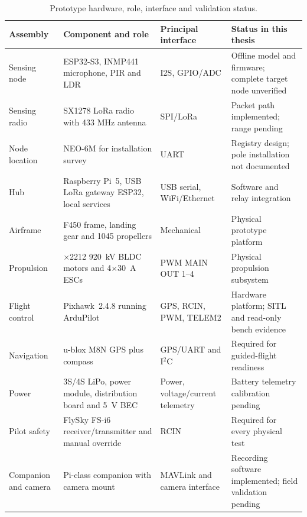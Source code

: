 \documentclass[12pt,a4paper]{report}
\begin{document}
\begin{table}[H]
\centering
\caption{Prototype hardware, role, interface and validation status.}
\label{tab:prototypebom}
\small
\begin{tabular}{|>{\raggedright\arraybackslash}p{}|>{\raggedright\arraybackslash}p{}|>{\raggedright\arraybackslash}p{}|>{\raggedright\arraybackslash}p{}|}
\hline
\textbf{Assembly} & \textbf{Component and role} & \textbf{Principal interface} & \textbf{Status in this thesis} \\
\hline
Sensing node & ESP32-S3, INMP441 microphone, PIR and LDR & I2S, GPIO/ADC & Offline model and firmware; complete target node unverified \\
\hline
Sensing radio & SX1278 LoRa radio with 433 MHz antenna & SPI/LoRa & Packet path implemented; range pending \\
\hline
Node location & NEO-6M for installation survey & UART & Registry design; pole installation not documented \\
\hline
Hub & Raspberry Pi~5, USB LoRa gateway ESP32, local services & USB serial, WiFi/Ethernet & Software and relay integration \\
\hline
Airframe & F450 frame, landing gear and 1045 propellers & Mechanical & Physical prototype platform \\
\hline
Propulsion & 4$\times$2212 920~kV BLDC motors and 4$\times$30~A ESCs & PWM MAIN OUT 1--4 & Physical propulsion subsystem \\
\hline
Flight control & Pixhawk~2.4.8 running ArduPilot & GPS, RCIN, PWM, TELEM2 & Hardware platform; SITL and read-only bench evidence \\
\hline
Navigation & u-blox M8N GPS plus compass & GPS/UART and I$^2$C & Required for guided-flight readiness \\
\hline
Power & 3S/4S LiPo, power module, distribution board and 5~V BEC & Power, voltage/current telemetry & Battery telemetry calibration pending \\
\hline
Pilot safety & FlySky FS-i6 receiver/transmitter and manual override & RCIN & Required for every physical test \\
\hline
Companion and camera & Pi-class companion with camera mount & MAVLink and camera interface & Recording software implemented; field validation pending \\
\hline
\end{tabular}
\end{table}
\end{document}
